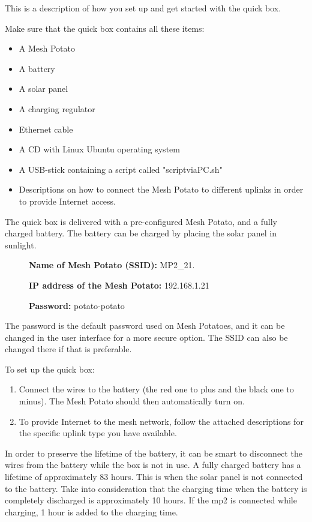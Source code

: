 This is a description of how you set up and get started with the \gls{quick} box. 

Make sure that the \gls{quick} box contains all these items: 
\begin{itemize}
\item A Mesh Potato
\item A battery
\item A solar panel
\item A charging regulator
\item Ethernet cable
\item A CD with Linux Ubuntu operating system
\item A USB-stick containing a script called "scriptviaPC.sh"
\item Descriptions on how to connect the Mesh Potato to different uplinks in order to provide Internet access. 
\end{itemize}

The \gls{quick} box is delivered with a pre-configured Mesh Potato, and a fully charged battery. The battery can be charged by placing the solar panel in sunlight. 

\begin{description}
\item[] \textbf{Name of Mesh Potato (SSID):} MP2_21.
\item[] \textbf{IP address of the Mesh Potato:} 192.168.1.21
\item[] \textbf{Password:} potato-potato 
\end{description}

The password is the default password used on Mesh Potatoes, and it can be changed in the user interface for a more secure option. The SSID can also be changed there if that is preferable. 

To set up the \gls{quick} box: 
\begin{enumerate}
\item Connect the wires to the battery (the red one to plus and the black one to minus). The Mesh Potato should then automatically turn on. 
\item To provide Internet to the mesh network, follow the attached descriptions for the specific uplink type you have available. 
\end{enumerate} 

In order to preserve the lifetime of the battery, it can be smart to disconnect the wires from the battery while the box is not in use. A fully charged battery has a lifetime of approximately 83 hours. This is when the solar panel is not connected to the battery. Take into consideration that the charging time when the battery is completely discharged is approximately 10 hours. If the \gls{mp2} is connected while charging, 1 hour is added to the charging time. 
